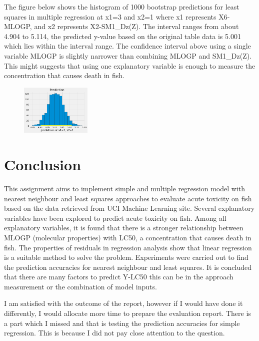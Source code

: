 \documentclass{ueacmpstyle}
\begin{document}
    	The figure below shows the histogram of 1000 bootstrap predictions for least squares in multiple regression at x1=3 and x2=1 where x1 represents X6-MLOGP, and x2 represents X2-SM1\_Dz(Z). The interval ranges from about 4.904 to 5.114, the predicted y-value based on the original table data is 5.001 which lies within the interval range. The confidence interval above using a single variable MLOGP is slightly narrower than combining MLOGP and SM1\_Dz(Z). This might suggests that using one explanatory variable is enough to measure the concentration that causes death in fish.
    	\begin{figure}[!htb]
    	\centering
    	\includegraphics[width=0.3\textwidth]{hist_mult_1.png}	
    	\label{fig5}
    	\end{figure}
    \newpage
    \section{Conclusion}\label{sec:conclusion}
    
    This assignment aims to implement simple and multiple regression model with nearest neighbour and least squares approaches to evaluate acute toxicity on fish based on the data retrieved from UCI Machine Learning site. Several explanatory variables have been explored to predict acute toxicity on fish. Among all explanatory variables, it is found that there is a stronger relationship between MLOGP (molecular properties) with LC50, a concentration that causes death in fish. The properties of residuals in regression analysis show that linear regression is a suitable method to solve the problem. Experiments were carried out to find the prediction accuracies for nearest neighbour and least squares. It is concluded that there are many factors to predict Y-LC50 this can be in the approach measurement or the combination of model inputs.
 	
 	I am satisfied with the outcome of the report, however if I would have done it differently, I would allocate more time to prepare the evaluation report. There is a part which I missed and that is testing the prediction accuracies for simple regression. This is because I did not pay close attention to the question. 
    
    
	
	
\end{document}
